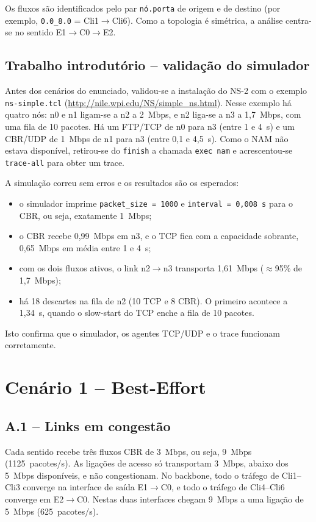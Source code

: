 \IfFileExists{llncs.cls}{\documentclass[runningheads]{llncs}}{\documentclass{article}}
\newcommand{\esp}[1]{#1}
\begin{document}
Os fluxos são identificados pelo par \texttt{nó.porta} de origem e de destino (por exemplo,
\texttt{0.0\_8.0} = Cli1$\rightarrow$Cli6). Como a topologia é simétrica, a análise centra-se
no sentido E1$\rightarrow$C0$\rightarrow$E2.

\subsection{Trabalho introdutório -- validação do simulador}
Antes dos cenários do enunciado, validou-se a instalação do NS-2 com o exemplo
\texttt{ns-simple.tcl} (\url{http://nile.wpi.edu/NS/simple_ns.html}). Nesse exemplo há quatro
nós: n0 e n1 ligam-se a n2 a 2~Mbps, e n2 liga-se a n3 a 1,7~Mbps, com uma fila de 10 pacotes.
Há um FTP/TCP de n0 para n3 (entre 1 e 4~s) e um CBR/UDP de 1~Mbps de n1 para n3 (entre 0,1 e
4,5~s). Como o NAM não estava disponível, retirou-se do \texttt{finish} a chamada
\texttt{exec nam} e acrescentou-se \texttt{trace-all} para obter um trace.

A simulação correu sem erros e os resultados são os esperados:
\begin{itemize}
\item o simulador imprime \texttt{packet\_size = 1000} e \texttt{interval = 0,008~s} para o
CBR, ou seja, exatamente 1~Mbps;
\item o CBR recebe \esp{0,99~Mbps} em n3, e o TCP fica com a capacidade sobrante,
\esp{0,65~Mbps} em média entre 1 e 4~s;
\item com os dois fluxos ativos, o link n2$\rightarrow$n3 transporta \esp{1,61~Mbps}
($\approx$95\% de 1,7~Mbps);
\item há \esp{18 descartes} na fila de n2 (10 TCP e 8 CBR). O primeiro acontece a
\esp{1,34~s}, quando o slow-start do TCP enche a fila de 10 pacotes.
\end{itemize}
Isto confirma que o simulador, os agentes TCP/UDP e o trace funcionam corretamente.

\section{Cenário 1 -- Best-Effort}

\subsection{A.1 -- Links em congestão}
Cada sentido recebe três fluxos CBR de 3~Mbps, ou seja, 9~Mbps (1125~pacotes/s). As ligações
de acesso só transportam 3~Mbps, abaixo dos 5~Mbps disponíveis, e não congestionam. No
backbone, todo o tráfego de Cli1--Cli3 converge na interface de saída E1$\rightarrow$C0, e todo
o tráfego de Cli4--Cli6 converge em E2$\rightarrow$C0. Nestas duas interfaces chegam 9~Mbps a
uma ligação de 5~Mbps (625~pacotes/s).
\end{document}
